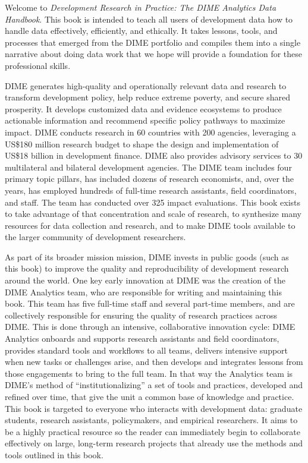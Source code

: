 \begin{fullwidth}
Welcome to \textit{Development Research in Practice: The DIME Analytics Data Handbook}.
This book is intended to teach all users of development data
how to handle data effectively, efficiently, and ethically.
It takes lessons, tools, and processes that emerged from the DIME portfolio
and compiles them into a single narrative about doing data work
that we hope will provide a foundation for these professional skills.

DIME generates high-quality and operationally relevant data and research
to transform development policy, help reduce extreme poverty, and secure shared prosperity.
It develops customized data and evidence ecosystems to produce actionable information
and recommend specific policy pathways to maximize impact.
DIME conducts research in 60 countries with 200 agencies, leveraging a
US\$180 million research budget to shape the design and implementation of
US\$18 billion in development finance.
DIME also provides advisory services to 30 multilateral and bilateral development agencies.
The DIME team includes four primary topic pillars,
has included dozens of research economists,
and, over the years, has employed hundreds of full-time research assistants, field coordinators, and staff.
The team has conducted over 325 impact evaluations.
This book exists to take advantage of that concentration and scale of research,
to synthesize many resources for data collection and research,
and to make DIME tools available to the larger community of development researchers.

As part of its broader mission mission, DIME invests in public goods (such as this book)
to improve the quality and reproducibility of development research around the world.
One key early innovation at DIME was the creation of the DIME Analytics team,
who are responsible for writing and maintaining this book.
This team has five full-time staff and several part-time members,
and are collectively responsible for ensuring the quality of research practices across DIME.
This is done through an intensive, collaborative innovation cycle:
DIME Analytics onboards and supports research assistants and field coordinators,
provides standard tools and workflows to all teams,
delivers intensive support when new tasks or challenges arise,
and then develops and integrates lessons from those engagements to bring to the full team.
In that way the Analytics team is DIME's method of ``institutionalizing''
a set of tools and practices, developed and refined over time,
that give the unit a common base of knowledge and practice.
This book is targeted to everyone who interacts with development data:
graduate students, research assistants, policymakers, and empirical researchers.
It aims to be a highly practical resource so the reader can
immediately begin to collaborate effectively on large, long-term research projects
that already use the methods and tools outlined in this book.

\end{fullwidth}

